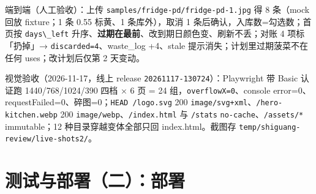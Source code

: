 端到端（人工验收）：上传 \passthrough{\lstinline!samples/fridge-pd/fridge-pd-1.jpg!}
得 8 条（mock 回放 fixture；1 条 0.55 标黄、1 条库外），取消 1
条后确认，入库数=勾选数；首页按 \passthrough{\lstinline!days\_left!}
升序、\textbf{过期在最前}、改到期日颜色变、刷新不丢；对账 4
项标「扔掉」→ \passthrough{\lstinline!discarded=4!}、waste\_log
+4、stale 提示消失；计划里过期菠菜不在任何 uses；改计划后仅第 2 天变动。

视觉验收（2026-11-17，线上 release
\passthrough{\lstinline!20261117-130724!}）：Playwright 带 Basic 认证跑
1440/768/1024/390 四档 × 6 页 = 24
组，\passthrough{\lstinline!overflowX=0!}、console
error=0、requestFailed=0、碎图=0；\passthrough{\lstinline!HEAD /logo.svg!}
200
\passthrough{\lstinline!image/svg+xml!}、\passthrough{\lstinline!/hero-kitchen.webp!}
200
\passthrough{\lstinline!image/webp!}、\passthrough{\lstinline!/index.html!}
与 \passthrough{\lstinline!/stats!}
\passthrough{\lstinline!no-cache!}、\passthrough{\lstinline!/assets/*!}
immutable；12 种目录穿越变体全部只回 index.html。截图存
\passthrough{\lstinline!temp/shiguang-review/live-shots2/!}。

\section{测试与部署（二）：部署}\label{ux90e8ux7f72ux4e0eux8fd0ux7ef4}

